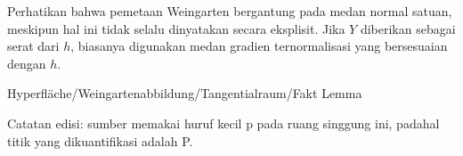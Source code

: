 Perhatikan bahwa pemetaan Weingarten bergantung pada medan normal satuan, meskipun hal ini tidak selalu dinyatakan secara eksplisit. Jika $Y$ diberikan sebagai serat dari $h$, biasanya digunakan medan gradien ternormalisasi yang bersesuaian dengan $h$.


{Hyperfläche/Weingartenabbildung/Tangentialraum/Fakt}
{Lemma}
{}
{

Catatan edisi: sumber memakai huruf kecil p pada ruang singgung ini, padahal titik yang dikuantifikasi adalah P.
\faktzusatz {}
\faktzusatz {}

}
